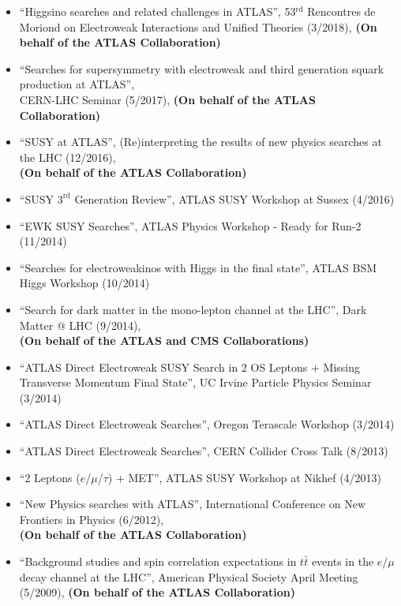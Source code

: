 \documentclass[a4paper,10pt]{article}
\begin{document}
\begin{itemize}
	\item ``Higgsino searches and related challenges in ATLAS'', 53$^{\mathrm{rd}}$ Rencontres de Moriond on Electroweak Interactions and Unified Theories (3/2018), {\bf (On behalf of the ATLAS Collaboration)}
	\item ``Searches for supersymmetry with electroweak and third generation squark production at ATLAS'', \\ CERN-LHC Seminar (5/2017),
	{\bf (On behalf of the ATLAS Collaboration)}
	\item ``SUSY at ATLAS'', (Re)interpreting the results of new physics searches at the LHC (12/2016),
	\\ {\bf (On behalf of the ATLAS Collaboration)}
	\item ``SUSY $3^{\mathrm{rd}}$ Generation Review'', ATLAS SUSY Workshop at Sussex (4/2016)
	\item ``EWK SUSY Searches'', ATLAS Physics Workshop - Ready for Run-2  (11/2014)
	\item ``Searches for electroweakinos with Higgs in the final state'', ATLAS BSM Higgs Workshop (10/2014)
	\item  ``Search for dark matter in the mono-lepton channel at the LHC'', Dark Matter @ LHC (9/2014),
	\\ {\bf (On behalf of the ATLAS and CMS Collaborations)}
	\item ``ATLAS Direct Electroweak SUSY Search in 2 OS Leptons + Missing Transverse Momentum Final State'',
	UC Irvine Particle Physics Seminar (3/2014)
	\item ``ATLAS Direct Electroweak Searches'', Oregon Terascale Workshop (3/2014)
	\item ``ATLAS Direct Electroweak Searches'', CERN Collider Cross Talk (8/2013)
	\item ``2 Leptons ($e$/$\mu$/$\tau$) + MET'', ATLAS SUSY Workshop at Nikhef (4/2013)
	\item ``New Physics searches with ATLAS'', International Conference on New Frontiers in Physics (6/2012),
	\\ {\bf (On behalf of the ATLAS Collaboration)}
	\item ``Background studies and spin correlation expectations in $t\bar{t}$ events in the $e/\mu$ decay channel at the LHC'',
	American Physical Society April Meeting (5/2009), {\bf (On behalf of the ATLAS Collaboration)}
\end{itemize}
\end{document}
